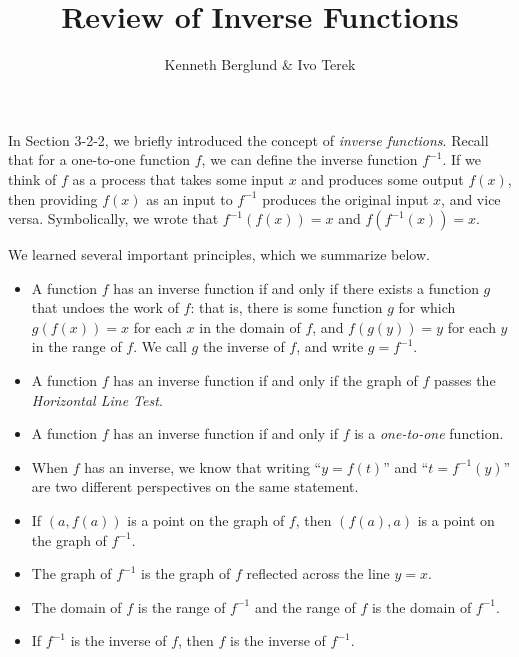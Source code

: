 \documentclass[nooutcomes]{ximera}
\author{Kenneth Berglund \& Ivo Terek}
\title{Review of Inverse Functions}
\begin{document}
\licenseSZ
\begin{abstract}
  
\end{abstract}
\maketitle





In Section 3-2-2, we briefly introduced the concept of \emph{inverse functions}. Recall that for a one-to-one function $f$, we can define the inverse function $f^{-1}$. If we think of $f$ as a process that takes some input $x$ and produces some output $f(x)$, then providing $f(x)$ as an input to $f^{-1}$ produces the original input $x$, and vice versa. Symbolically, we wrote that $f^{-1}(f(x)) = x$ and $f(f^{-1}(x)) = x$. 

We learned several important principles, which we summarize below.
\begin{itemize}
\item
A function $f$ has an inverse function if and only if there exists a function $g$ that undoes the work of $f$: that is, there is some function $g$ for which $g(f(x)) = x$ for each $x$ in the domain of $f$, and $f(g(y)) = y$ for each $y$ in the range of $f$. We call $g$ the inverse of $f$, and write $g = f^{-1}$.%
\item
A function $f$ has an inverse function if and only if the graph of $f$ passes the {\it Horizontal Line Test}.
\item
A function $f$ has an inverse function if and only if $f$ is a {\it one-to-one} function.
\item
When $f$ has an inverse, we know that writing ``$y = f(t)$'' and ``$t = f^{-1}(y)$''  are two different perspectives on the same statement.
\item If $(a, f(a))$ is a point on the graph of $f$, then $(f(a), a)$ is a point on the graph of $f^{-1}$. 
\item The graph of $f^{-1}$ is the graph of $f$ reflected across the line $y = x$.
\item The domain of $f$ is the range of $f^{-1}$ and the range of $f$ is the domain of $f^{-1}$.
\item If $f^{-1}$ is the inverse of $f$, then $f$ is the inverse of $f^{-1}$.

\end{itemize}
\end{document}
